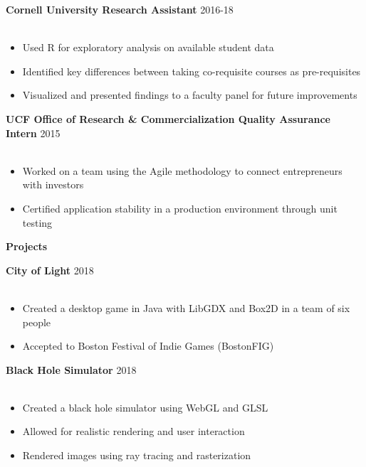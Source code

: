 \documentclass[12pt]{article}
\newcommand{\group}[1]{
	\fontsize{14}{0} \selectfont
	\textbf{#1}
}
\newcommand{\jobCaption}[2]{
	\hspace{0.3em}
	\fontsize{12}{13} \selectfont
	\textbf{#1}
	\fontsize{11}{12} \selectfont 
	\hfill{#2}\\[.1em]
}
\begin{document}
	
	\jobCaption{Cornell University Research Assistant}{2016-18}\\[-1.75em]
	\begin{itemize}[leftmargin=1.5cm]
		\setlength\itemsep{-.25em}
		\fontsize{11}{0} \selectfont 
	\item Used R for exploratory analysis on available student data
	\item Identified key differences between taking co-requisite courses as pre-requisites

\item Visualized and presented findings to a faculty panel for future improvements
	
	\end{itemize}
	
	\vspace{.7em}
\jobCaption{UCF Office of Research \& Commercialization Quality Assurance Intern}{2015}\\[-1.75em]
	\begin{itemize}[leftmargin=1.5cm]
		\setlength\itemsep{-.25em}
		\fontsize{11}{0} \selectfont 
	\item Worked on a team using the Agile methodology to connect entrepreneurs with investors
\item Certified application stability in a production environment through unit testing
	
	\end{itemize}

	\vspace{1em}

\group{Projects}
	\vspace{.4em}
	
	
\jobCaption{City of Light}{2018}\\[-1.75em]
	\begin{itemize}[leftmargin=1.5cm]
		\setlength\itemsep{-.25em}
		\fontsize{11}{0} \selectfont 
		\item Created a desktop game in Java with LibGDX and Box2D in a team of six people
		\item Accepted to Boston Festival of Indie Games (BostonFIG)
		
	\end{itemize}
	\vspace{.7em}
	
	\jobCaption{Black Hole Simulator}{2018}\\[-1.75em]
	\begin{itemize}[leftmargin=1.5cm]
		\setlength\itemsep{-.25em}
		\fontsize{11}{0} \selectfont 
		\item Created a black hole simulator using WebGL and GLSL
		\item Allowed for realistic rendering and user interaction
		\item Rendered images using ray tracing and rasterization
		
	\end{itemize}
	\vspace{.7em}
\end{document}
